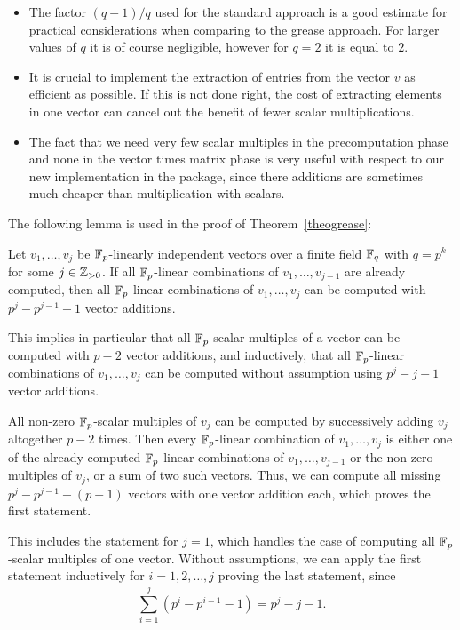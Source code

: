 \begin{Rems}
\begin{itemize}
\item The factor $(q-1)/q$ used for the standard approach is a
good estimate for practical considerations when comparing to
the grease approach. For larger values of $q$ it is of course negligible,
however for $q=2$ it is equal to $2$.
\item It is crucial to implement the extraction of entries
from the vector $v$ as efficient as possible. If this is not done
right, the cost of extracting elements in one vector can cancel out
the benefit of fewer scalar multiplications.
\item The fact that we need very few scalar multiples in the
precomputation phase and none in the vector times matrix phase is
very useful with respect to our new implementation in the
{\cvec} package, since there additions are sometimes much cheaper
than multiplication with scalars.
\end{itemize}
\end{Rems}
 
The following lemma is used in the proof of Theorem~\ref{theogrease}:

\begin{Lemm}
\label{alllinkomb}
Let $v_1, \ldots, v_{j}$ be $\mathbb{F}_p$-linearly  
independent vectors over a finite field $\mathbb{F}_q$ with $q = p^k$
for some $j \in \mathbb{Z}_{> 0}$. If
all $\mathbb{F}_p$-linear combinations of $v_1, \ldots, v_{j-1}$ are already
computed, then all $\mathbb{F}_p$-linear combinations of $v_1, \ldots, v_j$ can
be computed with $p^j - p^{j-1} - 1$ vector additions.

This implies in particular that all $\mathbb{F}_p$-scalar multiples of a vector
can be computed with $p-2$ vector additions, and inductively, that
all $\mathbb{F}_p$-linear combinations of $v_1, \ldots, v_j$ can be computed
without assumption using $p^j-j-1$ vector additions.
\end{Lemm}
\Proof All non-zero $\mathbb{F}_p$-scalar multiples of $v_j$ can be computed by
successively adding $v_j$ altogether $p-2$ times. Then every $\mathbb{F}_p$-linear
combination of $v_1, \ldots, v_j$ is either one of the already
computed $\mathbb{F}_p$-linear combinations of $v_1, \ldots, v_{j-1}$ or the
non-zero multiples of $v_j$, or a sum of two such vectors. Thus, we 
can compute all missing $p^j - p^{j-1} - (p-1)$ vectors with one
vector addition each, which proves the first statement. 

This includes the statement for $j=1$, which handles the case of computing
all $\mathbb{F}_p$-scalar multiples of one vector. Without assumptions, we can
apply the first statement inductively for $i=1, 2, \ldots, j$ proving
the last statement, since
\[ \sum_{i=1}^j (p^i - p^{i-1} - 1) = p^j - j - 1. \]
\ProofEnd

